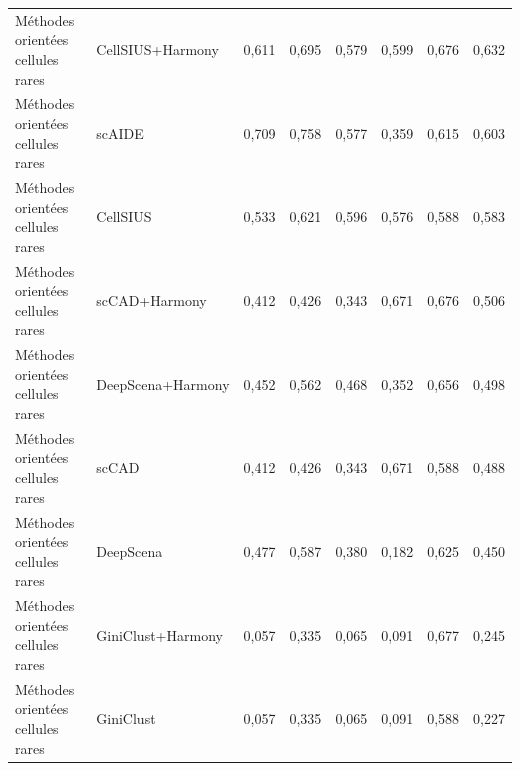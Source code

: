 {\begin{longtable}{p{}p{}rrrrrr}
Méthodes orientées cellules rares & CellSIUS+Harmony & 0,611 & 0,695 & 0,579 & 0,599 & 0,676 & 0,632 \\
Méthodes orientées cellules rares & scAIDE & 0,709 & 0,758 & 0,577 & 0,359 & 0,615 & 0,603 \\
Méthodes orientées cellules rares & CellSIUS & 0,533 & 0,621 & 0,596 & 0,576 & 0,588 & 0,583 \\
Méthodes orientées cellules rares & scCAD+Harmony & 0,412 & 0,426 & 0,343 & 0,671 & 0,676 & 0,506 \\
Méthodes orientées cellules rares & DeepScena+Harmony & 0,452 & 0,562 & 0,468 & 0,352 & 0,656 & 0,498 \\
Méthodes orientées cellules rares & scCAD & 0,412 & 0,426 & 0,343 & 0,671 & 0,588 & 0,488 \\
Méthodes orientées cellules rares & DeepScena & 0,477 & 0,587 & 0,380 & 0,182 & 0,625 & 0,450 \\
Méthodes orientées cellules rares & GiniClust+Harmony & 0,057 & 0,335 & 0,065 & 0,091 & 0,677 & 0,245 \\
Méthodes orientées cellules rares & GiniClust & 0,057 & 0,335 & 0,065 & 0,091 & 0,588 & 0,227 \\
\end{longtable}
}
